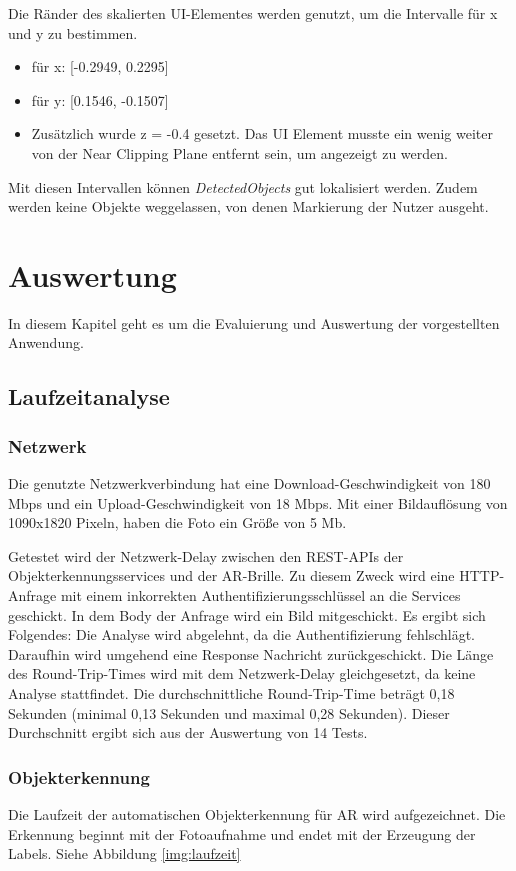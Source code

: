 Die Ränder des skalierten UI-Elementes werden genutzt, um die Intervalle für x und y zu bestimmen.
\begin{itemize}
	\item für x: [-0.2949, 0.2295]
	\item für y: [0.1546, -0.1507]
	\item Zusätzlich wurde z = -0.4 gesetzt. Das UI Element musste ein wenig weiter von der Near Clipping Plane entfernt sein, um angezeigt zu werden.
\end{itemize}

Mit diesen Intervallen können \textit{DetectedObjects} gut lokalisiert werden. Zudem werden keine Objekte weggelassen, von denen Markierung der Nutzer ausgeht.

\newpage
\section{Auswertung}

In diesem Kapitel geht es um die Evaluierung und Auswertung der vorgestellten Anwendung.

\subsection{Laufzeitanalyse}

\subsubsection{Netzwerk}

Die genutzte Netzwerkverbindung hat eine Download-Geschwindigkeit von 180 Mbps und ein Upload-Geschwindigkeit von 18 Mbps. Mit einer Bildauflösung von 1090x1820 Pixeln, haben die Foto ein Größe von 5 Mb. 

Getestet wird der Netzwerk-Delay zwischen den REST-APIs der Objekterkennungsservices und der AR-Brille. Zu diesem Zweck wird eine HTTP-Anfrage mit einem inkorrekten Authentifizierungsschlüssel an die Services geschickt. In dem Body der Anfrage wird ein Bild mitgeschickt. Es ergibt sich Folgendes: Die Analyse wird abgelehnt, da die Authentifizierung fehlschlägt. Daraufhin wird umgehend eine Response Nachricht zurückgeschickt. Die Länge des Round-Trip-Times wird mit dem Netzwerk-Delay gleichgesetzt, da keine Analyse stattfindet. Die durchschnittliche Round-Trip-Time beträgt 0,18 Sekunden (minimal 0,13 Sekunden und maximal 0,28 Sekunden). Dieser Durchschnitt ergibt sich aus der Auswertung von 14 Tests.

\subsubsection{Objekterkennung}
Die Laufzeit der automatischen Objekterkennung für AR wird aufgezeichnet. Die Erkennung beginnt mit der Fotoaufnahme und endet mit der Erzeugung der Labels.
Siehe Abbildung \ref{img:laufzeit}

